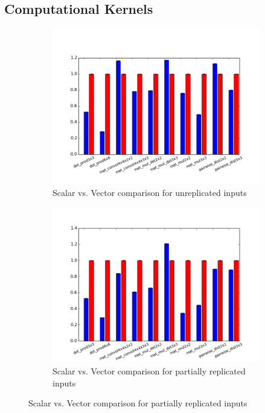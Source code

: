 \subsection{Computational Kernels}
\begin{figure}
	\vspace{-3em}
    \begin{subfigure}{\linewidth}
        \includegraphics[width=1\textwidth]{figures/newAspectRatioGraphs/DataUnreplicatedENC+RUN.png}
        \vspace{-3em}
        \caption{Scalar vs. Vector comparison for unreplicated inputs}\label{fig:ml-kernels-unrepl}
    \end{subfigure}
    
    \vspace{-2.5em}
    
    \begin{subfigure}{\linewidth}
        \includegraphics[width=1\textwidth]{figures/newAspectRatioGraphs/DataPartiallyReplicatedENC+RUN.png}
                \vspace{-3em}
        \caption{Scalar vs. Vector comparison for partially replicated inputs}\label{fig:ml-kernels-part-repl}
    \end{subfigure}
    

\end{figure}
